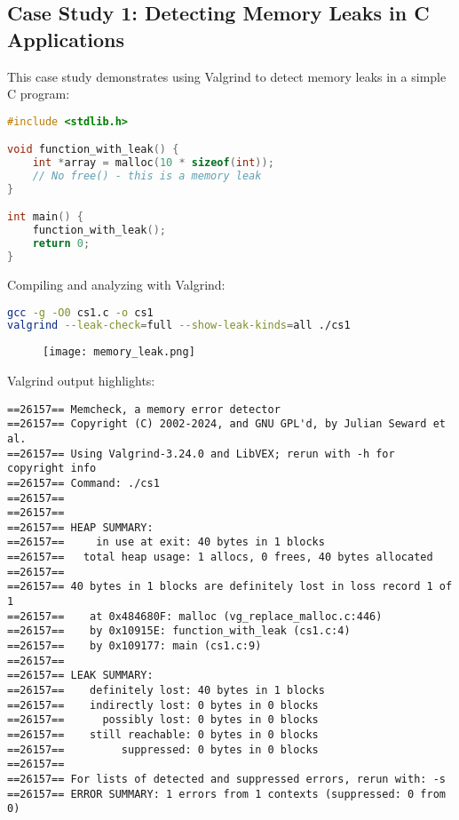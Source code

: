 \documentclass[11pt,a4paper]{article}
\begin{document}
\subsection{Case Study 1: Detecting Memory Leaks in C Applications}

This case study demonstrates using Valgrind to detect memory leaks in a simple C program:

\begin{lstlisting}[caption=Sample C program with memory leak, language=C]
#include <stdlib.h>

void function_with_leak() {
    int *array = malloc(10 * sizeof(int));
    // No free() - this is a memory leak
}

int main() {
    function_with_leak();
    return 0;
}
\end{lstlisting}

Compiling and analyzing with Valgrind:

\begin{lstlisting}[caption=Compiling and analyzing with Valgrind, language=bash]
gcc -g -O0 cs1.c -o cs1
valgrind --leak-check=full --show-leak-kinds=all ./cs1
\end{lstlisting}

\begin{center}
    \begin{figure}
    \texttt{[image: memory\_leak.png]}
\end{figure}
\end{center}
Valgrind output highlights:
\begin{verbatim}
==26157== Memcheck, a memory error detector
==26157== Copyright (C) 2002-2024, and GNU GPL'd, by Julian Seward et al.
==26157== Using Valgrind-3.24.0 and LibVEX; rerun with -h for copyright info
==26157== Command: ./cs1
==26157== 
==26157== 
==26157== HEAP SUMMARY:
==26157==     in use at exit: 40 bytes in 1 blocks
==26157==   total heap usage: 1 allocs, 0 frees, 40 bytes allocated
==26157== 
==26157== 40 bytes in 1 blocks are definitely lost in loss record 1 of 1
==26157==    at 0x484680F: malloc (vg_replace_malloc.c:446)
==26157==    by 0x10915E: function_with_leak (cs1.c:4)
==26157==    by 0x109177: main (cs1.c:9)
==26157== 
==26157== LEAK SUMMARY:
==26157==    definitely lost: 40 bytes in 1 blocks
==26157==    indirectly lost: 0 bytes in 0 blocks
==26157==      possibly lost: 0 bytes in 0 blocks
==26157==    still reachable: 0 bytes in 0 blocks
==26157==         suppressed: 0 bytes in 0 blocks
==26157== 
==26157== For lists of detected and suppressed errors, rerun with: -s
==26157== ERROR SUMMARY: 1 errors from 1 contexts (suppressed: 0 from 0)

\end{verbatim}
\end{document}
